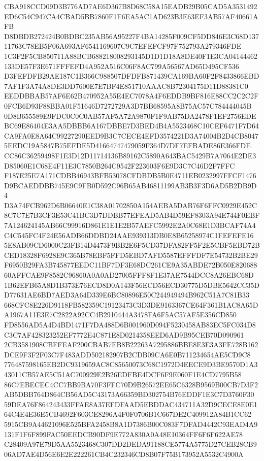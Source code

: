 \documentclass[UTF8,fontset=fandol,zihao=-4,a4paper]{ctexart}
\begin{document}
{{CBA918CCD09D3B776AD7AE6D367B8D68C58A15EADB29B05CAD5A3531492ED6C54C947CA4CBAD5BB7860F1F6EA5AC1AD623B3E63EF3AB57AF40661AFB
D8DBDB272424B0BDBC235AB56A95227F4BA14285F009CF5DD846E3C68D13711763C78EB5F06A693AF6541169607C9C7EFEFCF97F752793A279346FDE
1C3F2F5CB850711A88BCB688218008293145D1D1D18A8DE40F1E3CA04144462133DE57F3E671FFFEFD4A952A516C06F8AC799A56567AD65D495CF536
D3FEFDFB29AE187C1B366C988507DFDFB871439CA169BA60F2F8433866EBD7AF1F3A74A8DE3DD7600E7E7BF4E851710AAAC8B72304175D11D88381C0
EEDDBBAB57AF6E62B470952A55E4EC7078A4F6EDDB9BF816E88CC2C2C2F0FCB6D93F88BBA01F51646D7272729A3D7BB68595A8B75AC57C784444045B
0D8B655589E9FDC0C0C0AB57AF5A72A9870F1F9AB75DA2478F1EF2756EDEBC69E86404E3AA5DBBB6A167DBBE7D3BED4B4A5523468C10CEF6471F7D64
CA9FA0E8A64C99227290EED9B3C7CECE4EFD3574221D3A74004B2D4CB80475EEDC19A5847B75EFDE5D41664747479059F364D7DF7EFBADE86E366FDE
CC86C36259498F1E3D12D11714136B89162C5890A643BAC5429B7A7064E2DE3D85060E1C68E4F11E3C7850B264C9542F223603F6E9D3C7C46D2F7FFC
F187E25E7A171CDBB46943BFB53078CFDBDB5B0E4711EB0232997FFCF1476D9BCAEDDBB745E9C9FB0D592C96B65AB46811199AB3B3F3D6AD5B2DB9D4
D3A74FCB962D6B06640E1C38A01702850A154AEBA5DAB76F6FFC0929E452C8C7C7E7B3CF3E53C41BC3D7DDBB77EFEAD5AB4D59EF8303A94E744F0EBF
7A124624145AB66C99916D861E1E1E2B57AEFC5992E2A0C68E1D3BCAF74A4C4C545FC4F24E56ADB66DDBD24AAE939313DB0E8B65258974C1FEFEFE16
5E8AB09CD6000C23FB14D4473F9BB2E6F5CD37DFA82FF5F2E5CBF5EBD72BCED18328F6928E9C365B78EBF5FFD5EBD7AFD5587EFFFDF7E54732B2BE29
F6950B29FA3B745877EEDC11BF7DF3E68DC261CE9A35ABDE72B050E82068860AFFCAE9F8582C96860A0A0AD27005FFF8F1E37AE7544DCC8A26EBC68D
1B62EFB65A8D1B373E76ECD8D0A143F56ECD56ECD30775D5DBE5642CC35DD77631AE6BD7AED3A64D339E6BC80896E50C244949494B962C51A7C81B33
668CFC8E226D9118FB582359C19123473C3D3DE9163367CE64F361B1AC8A65DA1967A11E3E7C2822A92CC4B2910444A3478FA6F5AC57AF5E356CD850
FD8556AD5A4D4BD1471F7DA488D6B001960D094F5230458AB83EC5FC034D8C3C7AF428323252EF7772E4C871E8D0214358EED6AD9B95CEB70D090961
2CB3581908CBFFEAF200CBAB7EB8B22263A7295886BBE8E3E3A3FE728B162DCE9F3F2F03C7F483ADD502182907B2CDB09CA6E0B711234654AE5CD9C8
776487598165EB2DC9319659AC8C85650073C68C1972D4EECE9D3BE9570D1A343011CB57AE5C51AC700929E2B26EDFBE4DCF6F9E060F1E4CD7795B58
86C7EBECEC4CC7BB9BA70F3FFC70D9B26572EE65C6328B9569B00CB7D3F2AB5DBB764D864CB56AD5C43173A66359BD302754B76EDDF1E3C7D3760F30
59DEA76F864243433FFAE8A37EFDFAAD5EBDDAC434711A32D9CECE8E0E164C4E4E36E5CB4692F603CE8296A4F0F0706B1C667DE2C409912A84B1CC62
5915CB9A44621096E525BFA2458B8A1D7386B00C083F7DFAD4442C93EAD4A9131F1F6F899FAC50EEDCB90DF9E772A830A0A48E10364FF6F6F622AE78
C28409A97E79D5AA5523468C307DD2DEDA91188CE5774A5775D27CEB28CB906AD7AE4D56E6E2E222261CB4C232346CD8B07F75B173952A5532C4900A
}}
\end{document}
